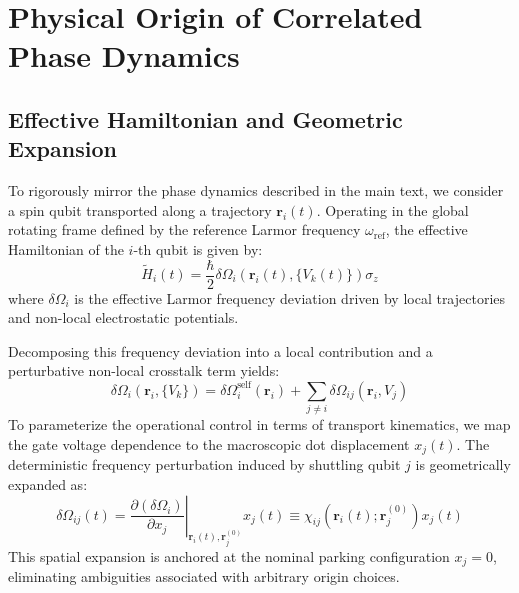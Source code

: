 \documentclass[a4paper,twocolumn,11pt]{quantumarticle}
\begin{document}






\onecolumn\newpage
\appendix



\section{Physical Origin of Correlated Phase Dynamics}
\label{app:phase_dynamics}

\subsection{Effective Hamiltonian and Geometric Expansion}

To rigorously mirror the phase dynamics described in the main text, we consider a spin qubit transported along a trajectory $\mathbf{r}_i(t)$. Operating in the global rotating frame defined by the reference Larmor frequency $\omega_{\text{ref}}$, the effective Hamiltonian of the $i$-th qubit is given by:
\begin{equation}
    \tilde{H}_i(t) = \frac{\hbar}{2} \delta\Omega_i(\mathbf{r}_i(t), \{V_k(t)\}) \sigma_z
\end{equation}
where $\delta\Omega_i$ is the effective Larmor frequency deviation driven by local trajectories and non-local electrostatic potentials. 

Decomposing this frequency deviation into a local contribution and a perturbative non-local crosstalk term yields:
\begin{equation}
    \delta\Omega_i(\mathbf{r}_i, \{V_k\}) = \delta\Omega_i^{\text{self}}(\mathbf{r}_i) + \sum_{j \neq i} \delta\Omega_{ij}(\mathbf{r}_i, V_j)
\end{equation}
To parameterize the operational control in terms of transport kinematics, we map the gate voltage dependence to the macroscopic dot displacement $x_j(t)$. The deterministic frequency perturbation induced by shuttling qubit $j$ is geometrically expanded as:
\begin{equation}
    \delta\Omega_{ij}(t) = \left. \frac{\partial (\delta\Omega_i)}{\partial x_j} \right|_{\mathbf{r}_i(t), \mathbf{r}_j^{(0)}} x_j(t) \equiv \chi_{ij}(\mathbf{r}_i(t); \mathbf{r}_j^{(0)}) x_j(t)
\end{equation}
This spatial expansion is anchored at the nominal parking configuration $x_j = 0$, eliminating ambiguities associated with arbitrary origin choices. 
\end{document}
